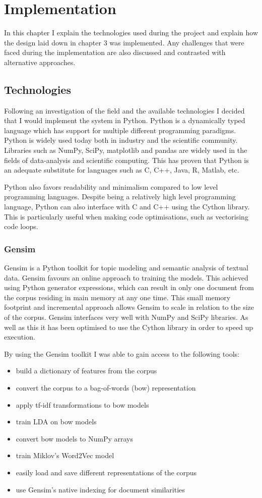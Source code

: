 \chapter{Implementation}

In this chapter I explain the technologies used during the project and explain how the design laid down in chapter 3 was implemented.
Any challenges that were faced during the implementation are also discussed and contrasted with alternative approaches.

\section{Technologies}
Following an investigation of the field and the available technologies I decided that I would implement the system in Python.
Python is a dynamically typed language which has support for multiple different programming paradigms.
Python is widely used today both in industry and the scientific community.
Libraries such as NumPy, SciPy, matplotlib and pandas are widely used in the fields of data-analysis and scientific computing.
This has proven that Python is an adequate substitute for languages such as C, C++, Java, R, Matlab, etc.

Python also favors readability and minimalism compared to low level programming languages.
Despite being a relatively high level programming language, Python can also interface with C and C++ using the Cython library.
This is particularly useful when making code optimisations, such as vectorising code loops.

\subsection{Gensim}
Gensim is a Python toolkit for topic modeling and semantic analysis of textual data.
Gensim favours an online approach to training the models.
This achieved using Python generator expressions, which can result in only one document from the corpus residing in main memory at any one time.
This small memory footprint and incremental approach allows Gensim to scale in relation to the size of the corpus.
Gensim interfaces very well with NumPy and SciPy libraries.
As well as this it has been optimised to use the Cython library in order to speed up execution.

By using the Gensim toolkit I was able to gain access to the following tools:
\begin{itemize}
    \item build a dictionary of features from the corpus
    \item convert the corpus to a bag-of-words (bow) representation
    \item apply tf-idf transformations to bow models
    \item train LDA on bow models
    \item convert bow models to NumPy arrays
    \item train Miklov's Word2Vec model
    \item easily load and save different representations of the corpus
    \item use Gensim's native indexing for document similarities
\end{itemize}

